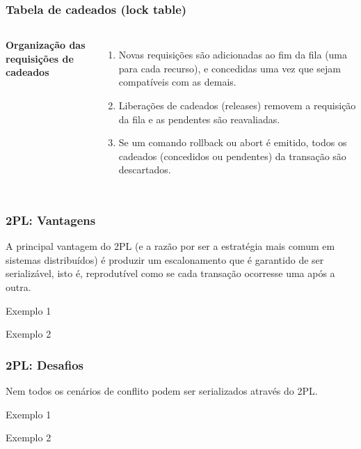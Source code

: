 \documentclass{beamer}
\begin{document}
    
    
\begin{frame}
    \frametitle{Tabela de cadeados (lock table)}
    \begin{columns}[c] %
    
    
    
        \textbf{Organização das requisições de cadeados}
        \begin{enumerate}
        \item Novas requisições são adicionadas ao fim da fila (uma para cada recurso), e concedidas uma vez que sejam compatíveis com as demais.
        \item Liberações de cadeados (releases) removem a requisição da fila e as pendentes são reavaliadas.
        \item Se um comando rollback ou abort é emitido, todos os cadeados (concedidos ou pendentes) da transação são descartados.
        \end{enumerate}
        \end{columns}
\end{frame}


\begin{frame}
    \frametitle{2PL: Vantagens}

    A principal vantagem do 2PL (e a razão por ser a estratégia mais comum em sistemas distribuídos) é produzir um escalonamento que é garantido de ser serializável, isto é, reprodutível como se cada transação ocorresse uma após a outra.
    \begin{block}{Exemplo 1}
    \end{block}

    \begin{block}{Exemplo 2}
    \end{block}

\end{frame}


\begin{frame}
\frametitle{2PL: Desafios}
Nem todos os cenários de conflito podem ser serializados através do 2PL. 

\begin{block}{Exemplo 1}
\end{block}

\begin{block}{Exemplo 2}
\end{block}

\end{frame}
\end{document}
